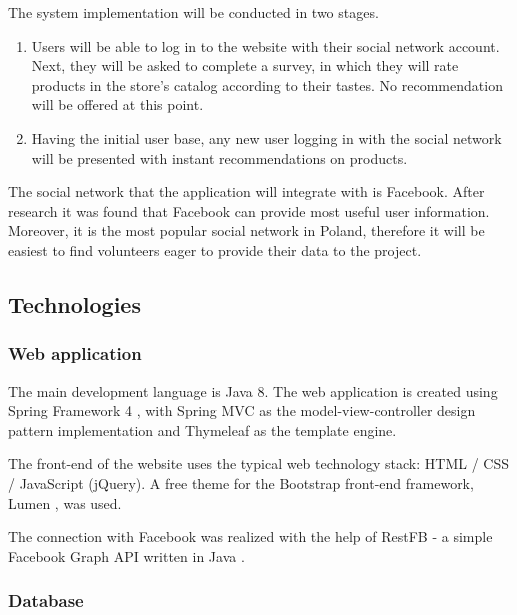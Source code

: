\documentclass[12pt]{report}
\begin{document}
The system implementation will be conducted in two stages.
\begin{enumerate}
\item Users will be able to log in to the website with their social network account. Next, they will be asked to complete a survey, in which they will rate products in the store's catalog according to their tastes. No recommendation will be offered at this point.
\item Having the initial user base, any new user logging in with the social network will be presented with instant recommendations on products.
\end{enumerate}

The social network that the application will integrate with is Facebook. After research it was found that Facebook can provide most useful user information. Moreover, it is the most popular social network in Poland, therefore it will be easiest to find volunteers eager to provide their data to the project.

\subsection{Technologies}
\subsubsection{Web application}
The main development language is Java 8. The web application is created using Spring Framework 4 \cite{spring_framework}, with Spring MVC as the model-view-controller design pattern implementation and Thymeleaf as the template engine. 

The front-end of the website uses the typical web technology stack: HTML / CSS / JavaScript (jQuery). A free theme for the Bootstrap front-end framework, Lumen \cite{lumen}, was used.

The connection with Facebook was realized with the help of RestFB - a simple Facebook Graph API written in Java \cite{restfb}.


\subsubsection{Database}
\end{document}
